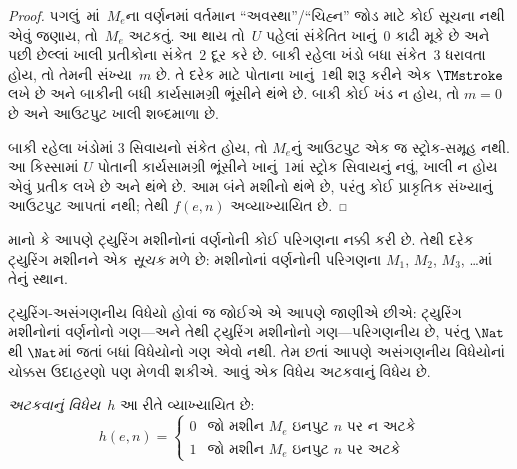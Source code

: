 \begin{proof}
  પગલું~માં~$M_e$ના વર્ણનમાં વર્તમાન
  ``અવસ્થા''/``ચિહ્ન'' જોડ માટે કોઈ સૂચના નથી એવું જણાય,
  તો~$M_e$ અટકતું. આ થાય તો~$U$ પહેલાં સંકેતિત
  ખાનું~$0$ કાઢી મૂકે છે અને પછી છેલ્લાં ખાલી પ્રતીકોના
  સંકેત~$2$ દૂર કરે છે. બાકી રહેલા ખંડો બધા સંકેત~$3$
  ધરાવતા હોય, તો તેમની સંખ્યા~$m$ છે. તે દરેક માટે પોતાના
  ખાનું~$1$થી શરૂ કરીને એક $\TMstroke$ લખે છે અને બાકીની
  બધી કાર્યસામગ્રી ભૂંસીને થંભે છે. બાકી કોઈ ખંડ ન હોય,
  તો $m=0$ છે અને આઉટપુટ ખાલી શબ્દમાળા છે.

  બાકી રહેલા ખંડોમાં $3$ સિવાયનો સંકેત હોય, તો
  $M_e$નું આઉટપુટ એક જ સ્ટ્રોક-સમૂહ નથી. આ કિસ્સામાં
  $U$ પોતાની કાર્યસામગ્રી ભૂંસીને ખાનું~$1$માં સ્ટ્રોક
  સિવાયનું નવું, ખાલી ન હોય એવું પ્રતીક લખે છે અને થંભે છે.
  આમ બંને મશીનો થંભે છે, પરંતુ કોઈ પ્રાકૃતિક સંખ્યાનું
  આઉટપુટ આપતાં નથી; તેથી $f(e,n)$ અવ્યાખ્યાયિત છે.
\end{proof}

\endgroup


\begingroup
\makeatletter{}\makeatother

\label{guunit:OLP-0268}


\begin{explain}
માનો કે આપણે ટ્યુરિંગ મશીનોનાં વર્ણનોની કોઈ પરિગણના
નક્કી કરી છે. તેથી દરેક ટ્યુરિંગ મશીનને એક
\emph{સૂચક} મળે છે: મશીનોનાં વર્ણનોની પરિગણના
$M_1$, $M_2$, $M_3$, \dots{}માં તેનું સ્થાન.

ટ્યુરિંગ-અસંગણનીય વિધેયો હોવાં જ જોઈએ એ આપણે
જાણીએ છીએ: ટ્યુરિંગ મશીનોનાં વર્ણનોનો ગણ---અને તેથી
ટ્યુરિંગ મશીનોનો ગણ---પરિગણનીય છે, પરંતુ
$\Nat$થી $\Nat$માં જતાં બધાં વિધેયોનો ગણ એવો નથી.
તેમ છતાં આપણે અસંગણનીય વિધેયોનાં ચોક્કસ ઉદાહરણો પણ
મેળવી શકીએ. આવું એક વિધેય અટકવાનું વિધેય છે.
\end{explain}

\begin{defn}[અટકવાનું વિધેય]
 \emph{અટકવાનું વિધેય}~$h$ આ રીતે વ્યાખ્યાયિત છે:
\[
h(e,n) =
\begin{cases}
  \text{0} & \text{જો મશીન~$M_e$ ઇનપુટ $n$ પર ન અટકે} \\
  \text{1} & \text{જો મશીન~$M_e$ ઇનપુટ $n$ પર અટકે}
\end{cases}
\]
\end{defn}

